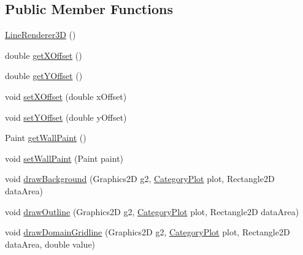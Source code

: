 \subsection*{Public Member Functions}
\begin{DoxyCompactItemize}
\item 
\mbox{\hyperlink{classorg_1_1jfree_1_1chart_1_1renderer_1_1category_1_1_line_renderer3_d_a50e7b8f18ef3348cbf5fada002c8b94d}{Line\+Renderer3D}} ()
\item 
double \mbox{\hyperlink{classorg_1_1jfree_1_1chart_1_1renderer_1_1category_1_1_line_renderer3_d_ad4ec91cbd2dd6ec17a01be964f076ad1}{get\+X\+Offset}} ()
\item 
double \mbox{\hyperlink{classorg_1_1jfree_1_1chart_1_1renderer_1_1category_1_1_line_renderer3_d_aeaf2b0eef57a0a0b9dbcf5b56af1c5fa}{get\+Y\+Offset}} ()
\item 
void \mbox{\hyperlink{classorg_1_1jfree_1_1chart_1_1renderer_1_1category_1_1_line_renderer3_d_ada06deb5c7f08ef5f6cb476cd8a08341}{set\+X\+Offset}} (double x\+Offset)
\item 
void \mbox{\hyperlink{classorg_1_1jfree_1_1chart_1_1renderer_1_1category_1_1_line_renderer3_d_a3f07b5e6292162fcbdf70da3f9d9e2a0}{set\+Y\+Offset}} (double y\+Offset)
\item 
Paint \mbox{\hyperlink{classorg_1_1jfree_1_1chart_1_1renderer_1_1category_1_1_line_renderer3_d_a3e748bdcb67c8caf5ff6ffec78b88f10}{get\+Wall\+Paint}} ()
\item 
void \mbox{\hyperlink{classorg_1_1jfree_1_1chart_1_1renderer_1_1category_1_1_line_renderer3_d_a536e0183a3e0f39f28bb026b2baad93c}{set\+Wall\+Paint}} (Paint paint)
\item 
void \mbox{\hyperlink{classorg_1_1jfree_1_1chart_1_1renderer_1_1category_1_1_line_renderer3_d_abac19ff7a3b3ecb6fb0b56775643b716}{draw\+Background}} (Graphics2D g2, \mbox{\hyperlink{classorg_1_1jfree_1_1chart_1_1plot_1_1_category_plot}{Category\+Plot}} plot, Rectangle2D data\+Area)
\item 
void \mbox{\hyperlink{classorg_1_1jfree_1_1chart_1_1renderer_1_1category_1_1_line_renderer3_d_afd00725f3c098ac7d359579b14969e8b}{draw\+Outline}} (Graphics2D g2, \mbox{\hyperlink{classorg_1_1jfree_1_1chart_1_1plot_1_1_category_plot}{Category\+Plot}} plot, Rectangle2D data\+Area)
\item 
void \mbox{\hyperlink{classorg_1_1jfree_1_1chart_1_1renderer_1_1category_1_1_line_renderer3_d_a34f9a55062dc1543b313b4677aa586e8}{draw\+Domain\+Gridline}} (Graphics2D g2, \mbox{\hyperlink{classorg_1_1jfree_1_1chart_1_1plot_1_1_category_plot}{Category\+Plot}} plot, Rectangle2D data\+Area, double value)

\end{DoxyCompactItemize}
